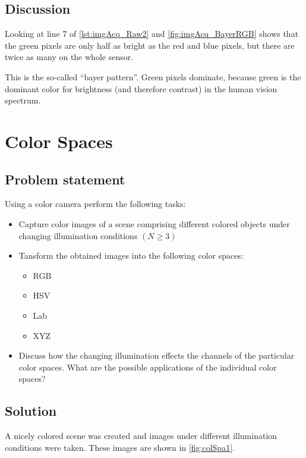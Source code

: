 \documentclass[
a4paper,     %
11pt         %
]{scrartcl}  %
\begin{document}
\subsection{Discussion}
Looking at line 7 of \cref{lst:imgAcq_Raw2} and \cref{fig:imgAcq_BayerRGB} shows that the green pixels are only half as bright as the red and blue pixels, but there are twice as many on the whole sensor.

This is the so-called ``bayer pattern''. Green pixels dominate, because green is the dominant color for brightness (and therefore contrast) in the human vision spectrum.


\clearpage
\section{Color Spaces} \label{sec:colSpa}

\subsection{Problem statement}

Using a color camera perform the following tasks:

\begin{itemize}
 \item Capture color images of a scene comprising different colored objects under changing illumination conditions $(N \geq 3)$
 \item Tansform the obtained images into the following color spaces:
 \begin{itemize}
  \item RGB 
  \item HSV
  \item Lab 
  \item XYZ
 \end{itemize}
 \item Discuss how the changing illumination effects the channels of the particular color spaces. What are the possible applications of the individual color spaces?
\end{itemize}

\subsection{Solution}

A nicely colored scene was created and images under different illumination conditions were taken. These images are shown in \cref{fig:colSpa1}.
\end{document}
